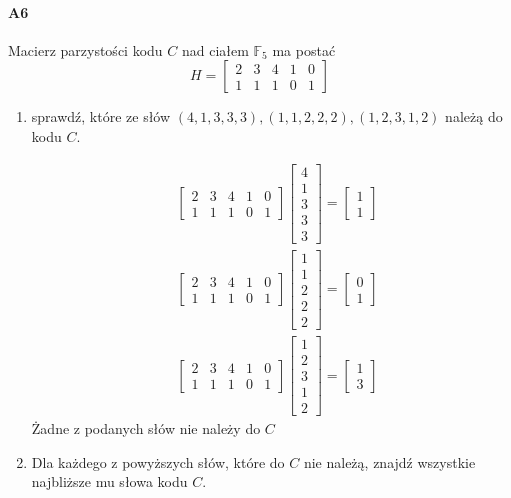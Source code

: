 \paragraph{A6} Macierz parzystości kodu $C$ nad ciałem $\mathbb{F}_5$ ma postać
$$H =\begin{bmatrix}
2& 3& 4& 1& 0\\
1& 1& 1& 0& 1 
\end{bmatrix}$$
\begin{enumerate}[label=\alph*)]
\item sprawdź, które ze słów $(4, 1, 3, 3, 3),(1, 1, 2, 2, 2),(1, 2, 3, 1, 2)$ należą do kodu $C$.

\begin{align*}
&\begin{bmatrix}
2& 3& 4& 1& 0\\
1& 1& 1& 0& 1 
\end{bmatrix}\begin{bmatrix}
4\\ 1\\ 3\\ 3\\ 3
\end{bmatrix}=\begin{bmatrix}
1\\1
\end{bmatrix}\\
&\begin{bmatrix}
2& 3& 4& 1& 0\\
1& 1& 1& 0& 1 
\end{bmatrix}\begin{bmatrix}
1\\ 1\\ 2\\ 2\\ 2
\end{bmatrix}=\begin{bmatrix}
0\\1
\end{bmatrix}\\
&\begin{bmatrix}
2& 3& 4& 1& 0\\
1& 1& 1& 0& 1 
\end{bmatrix}\begin{bmatrix}
1\\ 2\\ 3\\ 1\\ 2
\end{bmatrix}=\begin{bmatrix}
1\\3
\end{bmatrix}
\end{align*}
Żadne z podanych słów nie należy do $C$
\item Dla każdego z powyższych słów, które do $C$ nie należą, znajdź wszystkie najbliższe mu słowa kodu $C$.


\end{enumerate}
